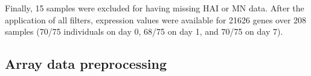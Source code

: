 Finally, 15 samples were excluded for having missing \gls{HAI} or \gls{MN} data.
After the application of all filters, expression values were available for \num{21626} genes over 208 samples
(70/75 individuals on day 0, 68/75 on day 1, and 70/75 on day 7).

\subsection{Array data preprocessing}
\label{subsec:hird_dge_array_preproc}

